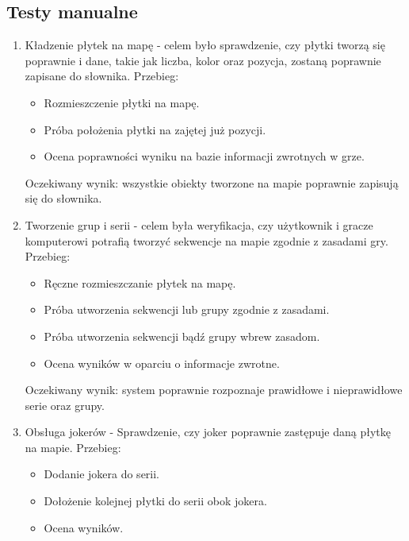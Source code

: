 \documentclass[a4paper,twoside,12pt]{book}
\begin{document}
	\subsection{Testy manualne}
	\begin{enumerate}
		\item Kładzenie płytek na mapę - celem było sprawdzenie, czy płytki tworzą się poprawnie i dane, takie jak liczba, kolor oraz pozycja, zostaną poprawnie zapisane do słownika. Przebieg:
		\begin{itemize}
			\item Rozmieszczenie płytki na mapę.
			\item Próba położenia płytki na zajętej już pozycji.
			\item Ocena poprawności wyniku na bazie informacji zwrotnych w grze.
			
		\end{itemize}
		Oczekiwany wynik: wszystkie obiekty tworzone na mapie poprawnie zapisują się do słownika. 
		\item Tworzenie grup i serii - celem była weryfikacja, czy użytkownik i gracze komputerowi potrafią tworzyć sekwencje na mapie zgodnie z zasadami gry. Przebieg:
			\begin{itemize}
			\item Ręczne rozmieszczanie płytek na mapę.
			\item Próba utworzenia sekwencji lub grupy zgodnie z zasadami.
			\item Próba utworzenia sekwencji bądź grupy wbrew zasadom. 
			\item Ocena wyników w oparciu o informacje zwrotne.
			\end{itemize}
			 Oczekiwany wynik: system poprawnie rozpoznaje prawidłowe i nieprawidłowe serie oraz grupy.
			
		\item Obsługa jokerów - Sprawdzenie, czy joker poprawnie zastępuje daną płytkę na mapie. Przebieg:
			\begin{itemize}
				\item Dodanie jokera do serii.
				\item Dołożenie kolejnej płytki do serii obok jokera.
				\item Ocena wyników.
				

\end{itemize}
\end{enumerate}
\end{document}
